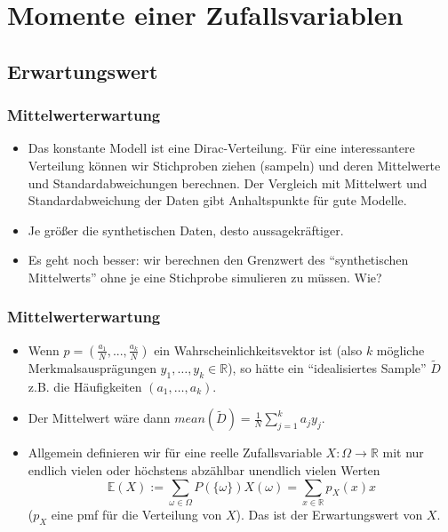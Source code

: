 \section{Momente einer Zufallsvariablen}

\subsection{Erwartungswert}

   \begin{frame}
    \frametitle{Mittelwerterwartung}
\begin{itemize}[<+->]
\item Das konstante Modell ist eine Dirac-Verteilung. Für eine interessantere Verteilung können wir Stichproben ziehen (sampeln) und deren Mittelwerte und Standardabweichungen berechnen. Der Vergleich mit Mittelwert und Standardabweichung der Daten gibt Anhaltspunkte für gute Modelle.
\item Je größer die synthetischen Daten, desto aussagekräftiger.
\item Es geht noch besser: wir berechnen den Grenzwert des ``synthetischen Mittelwerts'' ohne je eine Stichprobe simulieren zu müssen. Wie?
\end{itemize}
\end{frame}

   \begin{frame}
    \frametitle{Mittelwerterwartung}
    \begin{itemize}[<+->]
    \item Wenn $p = \left( \frac{a_1}{N}, ..., \frac{a_k}{N} \right)$ ein Wahrscheinlichkeitsvektor ist (also $k$ mögliche Merkmalsausprägungen $y_1,\dots,y_k \in \mathbb{R}$),
      so hätte ein ``idealisiertes Sample'' $\tilde{D}$ z.B. die Häufigkeiten $(a_1,\dots,a_k)$.
      \item Der Mittelwert wäre dann $mean(\tilde{D}) = \frac{1}{N} \sum_{j=1}^k a_j y_j$.
      \item Allgemein definieren wir für eine reelle Zufallsvariable $X \colon \Omega \to \mathbb{R}$ mit nur endlich vielen oder höchstens abzählbar unendlich vielen Werten
        \[\mathbb{E}(X) := \sum_{\omega \in \Omega} P(\{\omega\}) X(\omega) = \sum_{x \in \mathbb{R}} p_X(x)x\]
        ($p_X$ eine pmf für die Verteilung von $X$).
        Das ist der \alert{Erwartungswert} von $X$.
\end{itemize}
\end{frame}

